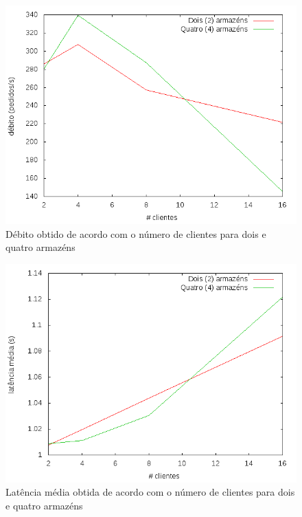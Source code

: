 \begin{figure}[!h]
\centering
\includegraphics[scale=.5]{img/questao-1/rep-read-deb}
\caption{Débito obtido de acordo com o número de clientes para dois e quatro armazéns}
\end{figure}

\begin{figure}[!h]
\centering
\includegraphics[scale=.5]{img/questao-1/rep-read-lat-med}
\caption{Latência média obtida de acordo com o número de clientes para dois e quatro armazéns}
\end{figure}

